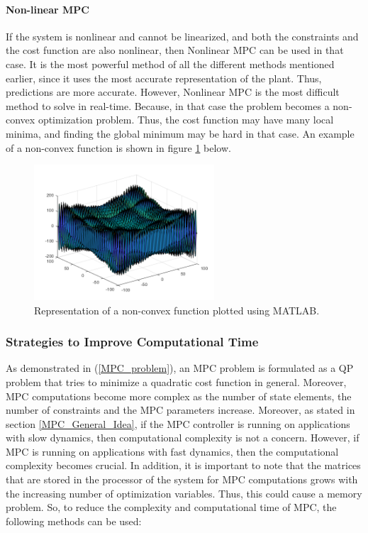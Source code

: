\documentclass{thesisreport}
\begin{document}
\paragraph{Non-linear MPC} If the system is nonlinear and cannot be linearized, and both the constraints and the cost function are also nonlinear, then Nonlinear MPC can be used in that case. It is the most powerful method of all the different methods mentioned earlier, since it uses the most accurate representation of the plant. Thus, predictions are more accurate. However, Nonlinear MPC is the most difficult method to solve in real-time. Because, in that case the problem becomes a non-convex optimization problem. Thus, the cost function may have many local minima, and finding the global minimum may be hard in that case. An example of a non-convex function is shown in figure \ref{nonconvex_function} below.


\begin{figure}[h]
\centering
\includegraphics[width=0.6\textwidth]{Images/Control/MPC_Nonconvex_Equation_b}
\caption{Representation of a non-convex function plotted using MATLAB.}
\label{nonconvex_function}
\end{figure}

\newpage

\subsubsection{Strategies to Improve Computational Time}

As demonstrated in (\ref{MPC_problem}), an MPC problem is formulated as a QP problem that tries to minimize a quadratic cost function in general. Moreover, MPC computations become more complex as the number of state elements, the number of constraints and the MPC parameters increase. Moreover, as stated in section \ref{MPC_General_Idea}, if the MPC controller is running on applications with slow dynamics, then computational complexity is not a concern. However, if MPC is running on applications with fast dynamics, then the computational complexity becomes crucial. In addition, it is important to note that the matrices that are stored in the processor of the system for MPC computations grows with the increasing number of optimization variables. Thus, this could cause a memory problem. So, to reduce the complexity and computational time of MPC, the following methods can be used:
\end{document}
